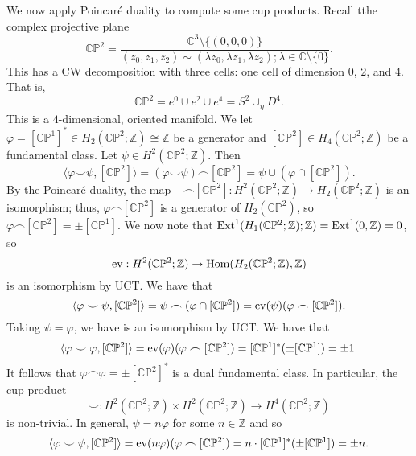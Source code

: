\begin{example}
    We now apply Poincar\'e duality to compute some cup products. Recall tthe complex projective plane
    \[ \mathbb C \mathbb P^2 = \dfrac
        {\mathbb C^3 \setminus \{(0,0,0)\}}
        {(z_0, z_1, z_2) \sim (\lambda z_0, \lambda z_1, \lambda z_2); \lambda \in \mathbb C \setminus \{0\}}. \]
    This has a CW decomposition with three cells: one cell of dimension $0$, $2$, and $4$. That is,
    \[ \mathbb C \mathbb P^2 = e^0 \cup e^2 \cup e^4 = S^2 \cup_{\eta} D^4. \]
    This is a $4$-dimensional, oriented manifold. We let $\varphi = [\mathbb C \mathbb P^1]^* \in H_2(\mathbb C \mathbb P^2; \mathbb Z) \cong \mathbb Z$ be a generator and $[\mathbb C \mathbb P^2] \in H_4(\mathbb C \mathbb P^2; \mathbb Z)$ be a fundamental class. Let $\psi \in H^2(\mathbb C \mathbb P^2; \mathbb Z)$. Then
    \[ \langle \varphi \smile \psi, [\mathbb C \mathbb P^2]\rangle = (\varphi \smile \psi) \frown [\mathbb C \mathbb P^2] = \psi \cup (\varphi \cap [\mathbb C \mathbb P^2]). \]
    By the Poincar\'e duality, the map $- \frown [\mathbb C \mathbb P^2]: H^2(\mathbb C \mathbb P^2; \mathbb Z) \to H_2(\mathbb C \mathbb P^2; \mathbb Z)$ is an isomorphism; thus, $\varphi \frown [\mathbb C \mathbb P^2]$ is a generator of $H_2(\mathbb C \mathbb P^2)$, so $\varphi \frown [\mathbb C \mathbb P^2] = \pm [\mathbb C \mathbb P^1]$. We now note that $\operatorname{Ext}^1(H_1(\mathbb C \mathbb P^2; \mathbb Z); \mathbb Z) = \operatorname{Ext}^1(0, \mathbb Z) = 0$, so
    \[ \operatorname{ev}: H^2(\mathbb C\mathbb P^2; \mathbb Z) \to \operatorname{Hom}(H_2(\mathbb C \mathbb P^2; \mathbb Z), \mathbb Z) \]
    is an isomorphism by UCT. We have that
    \[ \langle \varphi \smile \psi, [\mathbb C \mathbb P^2] \rangle = \psi \frown (\varphi \cap [\mathbb C \mathbb P^2]) = \operatorname{ev}(\psi) (\varphi \frown [\mathbb C \mathbb P^2]). \]
    Taking $\psi = \varphi$, we have
    is an isomorphism by UCT. We have that
    \[ \langle \varphi \smile \varphi, [\mathbb C \mathbb P^2] \rangle = \operatorname{ev}(\varphi) (\varphi \frown [\mathbb C \mathbb P^2]) = [\mathbb C \mathbb P^1]^* (\pm [\mathbb C \mathbb P^1]) = \pm 1. \]
    It follows that $\varphi \frown \varphi = \pm [\mathbb C \mathbb P^2]^*$ is a dual fundamental class. In particular, the cup product
    \[ \smile: H^2(\mathbb C \mathbb P^2; \mathbb Z) \times H^2(\mathbb C \mathbb P^2; \mathbb Z) \to H^4(\mathbb C \mathbb P^2; \mathbb Z) \]
    is non-trivial. In general, $\psi = n \varphi$ for some $n \in \mathbb Z$ and so
    \[ \langle \varphi \smile \psi, [\mathbb C \mathbb P^2] \rangle = \operatorname{ev}(n \varphi) (\varphi \frown [\mathbb C \mathbb P^2]) = n \cdot [\mathbb C \mathbb P^1]^*(\pm [\mathbb C \mathbb P^1]) = \pm n. \]
\end{example}

